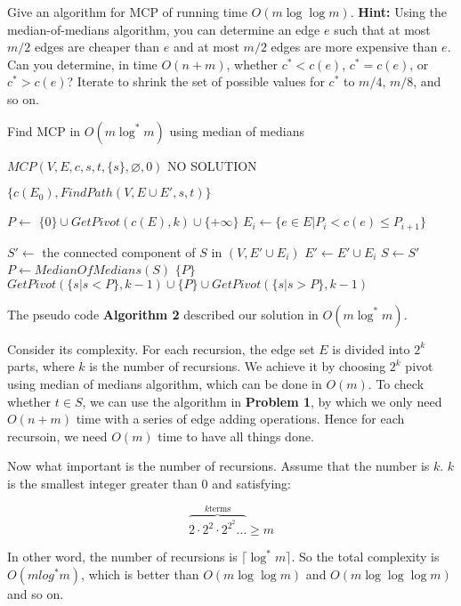 \documentclass[11pt,a4paper,oneside]{article}
\begin{document}
\begin{problem}{2}
	\statement
	Give an algorithm for MCP of running time $O(m \log \log m)$. \textbf{Hint:} Using the median-of-medians algorithm,
	you can determine an edge $e$ such that at most $m/2$ edges are cheaper than $e$ and at most $m/2$ edges are
	more expensive than $e$. Can you determine, in time $O(n+m)$, whether $c^* < c(e)$, $c^* = c(e)$, or $c^* > c(e)$?
	Iterate to shrink the set of possible
	values for $c^*$ to $m/4$, $m/8$, and so on.

	\solution
	
	\begin{algorithm}
		\caption{Find MCP in $O(m \log^* m)$ using median of medians}
		\begin{algorithmic}[1]

					\State \Return $MCP(V, E, c, s, t, \{s\}, \varnothing, 0)$
				\Else
					\State \Return NO SOLUTION
				\EndIf
			\EndFunction

				\State \Return $\{c(E_0), FindPath(V, E \cup E', s, t)\}$
			\EndIf
			
			\State $P \gets$ $\{0\} \cup GetPivot(c(E), k) \cup  \{+\infty\}$ 
			\State $E_i \gets \{e \in E | P_i < c(e) \leq P_{i+1} \}$

				\State $S' \gets$ the connected component of $S$ in $(V, E' \cup E_i)$
					\State {}
				\EndIf
				\State $E' \gets E' \cup E_i$
				\State $S \gets S'$
			\EndFor
			\EndFunction
				\State $P \leftarrow MedianOfMedians(S)$
					\State \Return $\{P\}$
				\Else
					\State \Return $GetPivot(\{s | s < P\}, k - 1) \cup \{P\} \cup GetPivot(\{s | s > P\}, k - 1)$
				\EndIf
			\EndFunction
		\end{algorithmic}
	\end{algorithm}

	The pseudo code \textbf{Algorithm 2} described our solution in $O(m \log ^ * m)$.

	Consider its complexity. For each recursion, the edge set \(E\) is divided into \(2^k\) parts, where \(k\) is the number of recursions. We achieve it by choosing \(2^k\) pivot using median of medians algorithm, which can be done in \(O(m)\). To check whether \(t \in S\), we can use the algorithm in \textbf{Problem 1}, by which we only need \(O(n+m)\) time with a series of edge adding operations. Hence for each recursoin, we need \(O(m)\) time to have all things done.
	
	Now what important is the number of recursions. Assume that the number is \(k\). \(k\) is the smallest integer greater than \(0\) and satisfying:
	
	\[\overbrace{2 \cdot 2^2 \cdot 2^{2^2} \dots}^{k \text{terms}} \geq m\]
	
	In other word, the number of recursions is \(\lceil \log^* m \rceil\). So the total complexity is \(O(mlog^*m)\), which is better than \(O(m\log\log m)\) and \(O(m\log\log\log m)\) and so on.
	
\end{problem}
\end{document}
